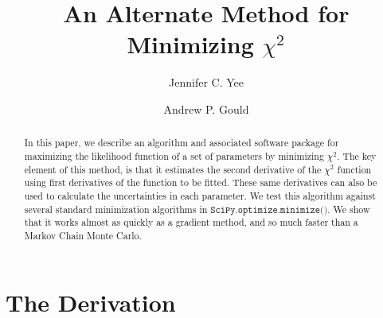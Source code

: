 \documentclass[preprint]{aastex631}
\newcommand{\minimize}{$\texttt{SciPy.optimize.minimize()}$}
\begin{document}
\title{An Alternate Method for Minimizing $\chi^2$}

\author{Jennifer C. Yee}
\author{Andrew P. Gould}

\begin{abstract}
In this paper, we describe an algorithm and associated software package for maximizing the likelihood function of a set of parameters by minimizing $\chi^2$. The key element of this method, is that it estimates the second derivative of the $\chi^2$ function using first derivatives of the function to be fitted. These same derivatives can also be used to calculate the uncertainties in each parameter. We test this algorithm against several standard minimization algorithms in \minimize. We show that it works almost as quickly as a gradient method, and so much faster than a Markov Chain Monte Carlo.
\end{abstract}

\section{The Derivation}
\end{document}
